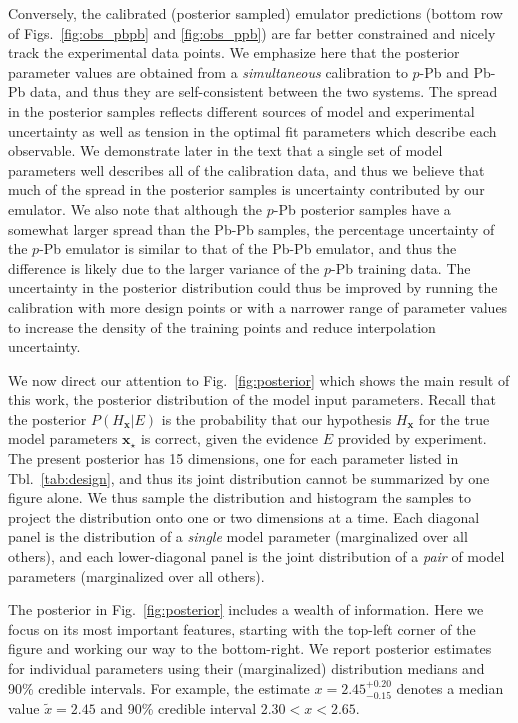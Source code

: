 \documentclass[aps,prc,reprint,amsmath,nofootinbib]{revtex4-1}
\newcommand{\x}{\mathbf{x}}
\begin{document}
Conversely, the calibrated (posterior sampled) emulator predictions (bottom row of Figs.~\ref{fig:obs_pbpb} and \ref{fig:obs_ppb}) are far better constrained and nicely track the experimental data points.
We emphasize here that the posterior parameter values are obtained from a \emph{simultaneous} calibration to $p$-Pb and Pb-Pb data, and thus they are self-consistent between the two systems.
The spread in the posterior samples reflects different sources of model and experimental uncertainty as well as tension in the optimal fit parameters which describe each observable.
We demonstrate later in the text that a single set of model parameters well describes all of the calibration data, and thus we believe that much of the spread in the posterior samples is uncertainty contributed by our emulator.
We also note that although the $p$-Pb posterior samples have a somewhat larger spread than the Pb-Pb samples, the percentage uncertainty of the $p$-Pb emulator is similar to that of the Pb-Pb emulator, and thus the difference is likely due to the larger variance of the $p$-Pb training data.
The uncertainty in the posterior distribution could thus be improved by running the calibration with more design points or with a narrower range of parameter values to increase the density of the training points and reduce interpolation uncertainty.

We now direct our attention to Fig.~\ref{fig:posterior} which shows the main result of this work, the posterior distribution of the model input parameters.
Recall that the posterior $P(H_\x | E)$ is the probability that our hypothesis $H_\x$ for the true model parameters $\x_\star$ is correct, given the evidence $E$ provided by experiment.
The present posterior has 15 dimensions, one for each parameter listed in Tbl.~\ref{tab:design}, and thus its joint distribution cannot be summarized by one figure alone.
We thus sample the distribution and histogram the samples to project the distribution onto one or two dimensions at a time.
Each diagonal panel is the distribution of a \emph{single} model parameter (marginalized over all others), and each lower-diagonal panel is the joint distribution of a \emph{pair} of model parameters (marginalized over all others).

The posterior in Fig.~\ref{fig:posterior} includes a wealth of information.
Here we focus on its most important features, starting with the top-left corner of the figure and working our way to the bottom-right.
We report posterior estimates for individual parameters using their (marginalized) distribution medians and 90\% credible intervals.
For example, the estimate $x=2.45_{-0.15}^{+0.20}$ denotes a median value $\tilde{x}=2.45$ and 90\% credible interval $2.30 < x < 2.65$.
\end{document}
